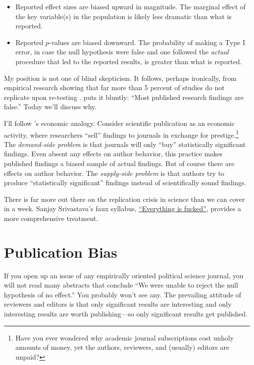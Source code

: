 \documentclass[12pt,oneside,openany]{book}
\begin{document}
\begin{itemize}
\item
  Reported effect sizes are biased upward in magnitude. The marginal
  effect of the key variable(s) in the population is likely less
  dramatic than what is reported.
\item
  Reported \(p\)-values are biased downward. The probability of making a
  Type I error, in case the null hypothesis were false and one followed
  the \emph{actual} procedure that led to the reported results, is
  greater than what is reported.
\end{itemize}

My position is not one of blind skepticism. It follows, perhaps
ironically, from empirical research showing that far more than 5 percent
of studies do not replicate upon re-testing \citep{open2015estimating}.
\citet{ioannidis2005most} puts it bluntly: ``Most published research
findings are false.'' Today we'll discuss why.

I'll follow \citet{young2008current}'s economic analogy. Consider
scientific publication as an economic activity, where researchers
``sell'' findings to journals in exchange for prestige.\footnote{Have
  you ever wondered why academic journal subscriptions cost unholy
  amounts of money, yet the authors, reviewers, and (usually) editors
  are unpaid?} The \emph{demand-side problem} is that journals will only
``buy'' statistically significant findings. Even absent any effects on
author behavior, this practice makes published findings a biased sample
of actual findings. But of course there are effects on author behavior.
The \emph{supply-side problem} is that authors try to produce
``statistically significant'' findings instead of scientifically sound
findings.

There is far more out there on the replication crisis in science than we
can cover in a week. Sanjay Srivastava's faux syllabus,
\href{https://hardsci.wordpress.com/2016/08/11/everything-is-fucked-the-syllabus/}{``Everything
is fucked''}, provides a more comprehensive treatment.

\section{Publication Bias}\label{publication-bias}

If you open up an issue of any empirically oriented political science
journal, you will not read many abstracts that conclude ``We were unable
to reject the null hypothesis of no effect.'' You probably won't see
any. The prevailing attitude of reviewers and editors is that only
significant results are interesting and only interesting results are
worth publishing---so only significant results get published.
\end{document}
